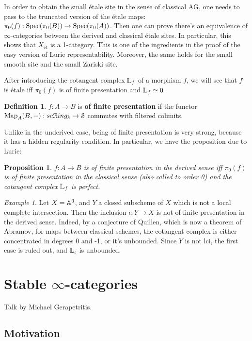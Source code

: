 \documentclass[10pt,a4paper,reqno,oneside]{book} %
\theoremstyle{plain}
\newtheorem{prop}[thm]{Proposition}
\theoremstyle{definition}
\newtheorem{defin}[thm]{Definition}
\theoremstyle{remark}
\newtheorem{eg}[thm]{Example}
\numberwithin{equation}{section}
\begin{document}
In order to obtain the small \'{e}tale site in the sense of classical AG, one needs to pass to the truncated version
of the \'etale maps: $\pi_0(f) : \operatorname{Spec}(\pi_0(B)) \to \operatorname{Spec}(\pi_0(A))$. Then one can prove there's an equivalence of 
$\infty$-categories between the derived and classical \'etale sites. In particular, this shows that 
$X_{\text{\'{e}t}}$ is a 1-category. This is one of the ingredients in the proof of the easy version
of Lurie representability. Moreover, the same holds for the small smooth site and the small Zariski site.

After introducing the cotangent complex $\mathbb L_f$ of a morphism $f$, we will see that $f$ is \'{e}tale iff $\pi_0(f)$ 
is of finite presentation and $\mathbb L_f \simeq 0$.

\begin{defin}
$f:A \to B$ is \textbf{of finite presentation} if the functor $\operatorname{Map}_A(B, - ) : sc\mathcal R ing_k \to \mathcal S$ commutes with
filtered colimits. 
\end{defin}

Unlike in the underived case, being of finite presentation is very strong, because it has a hidden regularity condition.
In particular, we have the proposition due to Lurie:

\begin{prop}
$f: A \to B$ is of finite presentation in the derived sense iff $\pi_0(f)$ is of finite presentation in the classical sense
(also called to order 0) and the cotangent complex $\mathbb L_f$ is perfect.
\end{prop}

\begin{eg}
Let $X = \mathbb A^3$, and $Y$ a closed subscheme of $X$ which is not a local complete intersection. 
Then the inclusion $\iota :Y \to X$ is not of finite presentation in the derived sense.
Indeed, by a conjecture of Quillen, which is now a theorem of Abramov, for maps between classical schemes, the cotangent 
complex is either concentrated in degrees 0 and -1, or it's unbounded. Since $Y$ is not lci, the first case is ruled out,
and $\mathbb L_{\iota}$ is unbounded.
\end{eg}





\chapter{Stable $\infty$-categories}
Talk by Michael Gerapetritis.

\section{Motivation}
\label{sect:motivation}
\end{document}
